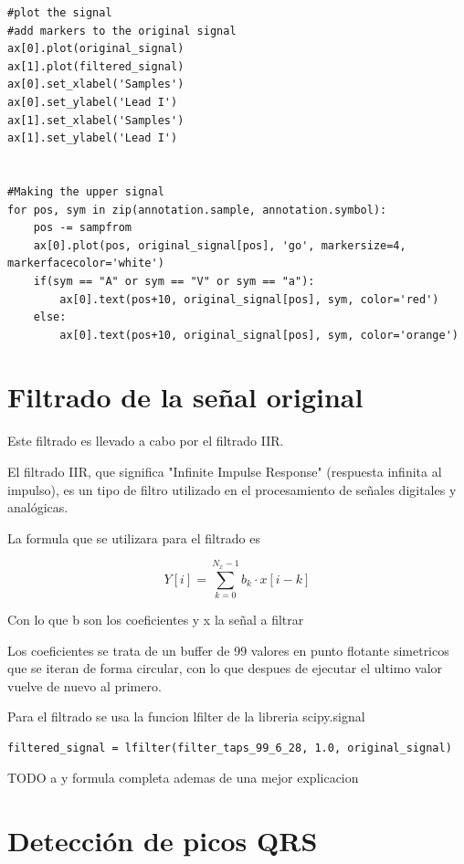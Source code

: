 \lstset{language=python, breaklines=true, basicstyle=\footnotesize}
\begin{lstlisting}[frame=single]
#plot the signal
#add markers to the original signal
ax[0].plot(original_signal)
ax[1].plot(filtered_signal)
ax[0].set_xlabel('Samples')
ax[0].set_ylabel('Lead I')
ax[1].set_xlabel('Samples')
ax[1].set_ylabel('Lead I')


#Making the upper signal
for pos, sym in zip(annotation.sample, annotation.symbol):
    pos -= sampfrom
    ax[0].plot(pos, original_signal[pos], 'go', markersize=4, markerfacecolor='white')
    if(sym == "A" or sym == "V" or sym == "a"):
        ax[0].text(pos+10, original_signal[pos], sym, color='red')
    else:
        ax[0].text(pos+10, original_signal[pos], sym, color='orange')
\end{lstlisting}

\section{Filtrado de la señal original}
Este filtrado es llevado a cabo por el filtrado IIR.

El filtrado IIR, que significa "Infinite Impulse Response" (respuesta infinita al impulso),
es un tipo de filtro utilizado en el procesamiento de señales digitales y analógicas.

La formula que se utilizara para el filtrado es

\[ Y[i] = \sum_{k=0}^{N_x -1} b_k \cdot x[i-k] \]

Con lo que b son los coeficientes y x la señal a filtrar

Los coeficientes se trata de un buffer de 99 valores en punto flotante simetricos que se iteran de forma 
circular, con lo que despues de ejecutar el ultimo valor vuelve de nuevo al primero.  

Para el filtrado se usa la funcion lfilter de la libreria scipy.signal

\lstset{language=python, breaklines=true, basicstyle=\footnotesize}
\begin{lstlisting}[frame=single]
    filtered_signal = lfilter(filter_taps_99_6_28, 1.0, original_signal)
\end{lstlisting}
TODO a y formula completa ademas de una mejor explicacion

\section{Detección de picos QRS}

